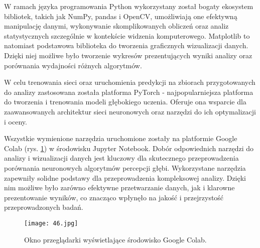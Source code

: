 W ramach języka programowania Python wykorzystany został bogaty ekosystem bibliotek, takich jak NumPy, pandas i OpenCV, umożliwiają one efektywną manipulację danymi, wykonywanie skomplikowanych obliczeń oraz analiz statystycznych szczególnie w kontekście widzenia komputerowego. Matplotlib to natomiast podstawowa biblioteka do tworzenia graficznych wizualizacji danych. Dzięki niej możliwe było tworzenie wykresów prezentujących wyniki analizy oraz porównania wydajności różnych algorytmów.

W celu trenowania sieci oraz uruchomienia predykcji na zbiorach przygotowanych do analizy zastosowana została platforma PyTorch - najpopularniejsza platforma do tworzenia i trenowania modeli głębokiego uczenia. Oferuje ona wsparcie dla zaawansowanych architektur sieci neuronowych oraz narzędzi do ich optymalizacji i oceny.

Wszystkie wymienione narzędzia uruchomione zostały na platformie Google Colab (rys. \ref{fig:google-colab}) w środowisku Jupyter Notebook. Dobór odpowiednich narzędzi do analizy i wizualizacji danych jest kluczowy dla skutecznego przeprowadzenia porównania neuronowych algorytmów percepcji głębi. Wykorzystane narzędzia zapewniły solidne podstawy dla przeprowadzenia kompleksowej analizy. Dzięki nim możliwe było zarówno efektywne przetwarzanie danych, jak i klarowne prezentowanie wyników, co znacząco wpłynęło na jakość i przejrzystość przeprowadzonych badań.
\begin{figure}[H]
    \centering
    \texttt{[image: 46.jpg]}
    \caption{Okno przeglądarki wyświetlające środowisko Google Colab.}
    \label{fig:google-colab}
\end{figure}
